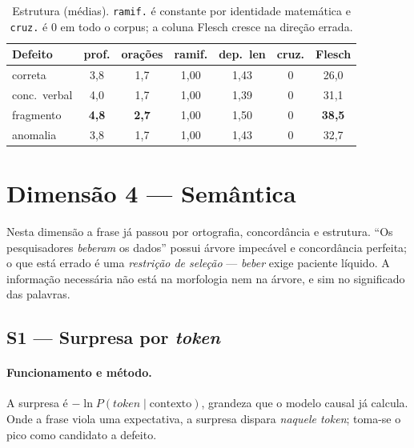 \documentclass[11pt,a4paper]{article}
\newcommand{\dimtable}[1]{\small #1}
\begin{document}
\begin{table}[H]
\centering
\dimtable{
\begin{tabular}{@{}lcccccc@{}}
\toprule
\textbf{Defeito} & \textbf{prof.} & \textbf{orações} & \textbf{ramif.} & \textbf{dep.\ len} & \textbf{cruz.} & \textbf{Flesch} \\
\midrule
correta        & 3{,}8 & 1{,}7 & 1{,}00 & 1{,}43 & 0 & 26{,}0 \\
conc.\ verbal  & 4{,}0 & 1{,}7 & 1{,}00 & 1{,}39 & 0 & 31{,}1 \\
fragmento      & \textbf{4{,}8} & \textbf{2{,}7} & 1{,}00 & 1{,}50 & 0 & \textbf{38{,}5} \\
anomalia       & 3{,}8 & 1{,}7 & 1{,}00 & 1{,}43 & 0 & 32{,}7 \\
\bottomrule
\end{tabular}}
\caption{Estrutura (médias). \texttt{ramif.} é constante por identidade matemática e \texttt{cruz.}
é 0 em todo o corpus; a coluna Flesch cresce na direção errada.}
\label{tab:estrutura}
\end{table}

\section{Dimensão 4 --- Semântica}

Nesta dimensão a frase já passou por ortografia, concordância e estrutura. ``Os pesquisadores
\emph{beberam} os dados'' possui árvore impecável e concordância perfeita; o que está errado é uma
\emph{restrição de seleção} --- \emph{beber} exige paciente líquido. A informação necessária não
está na morfologia nem na árvore, e sim no significado das palavras.

\subsection{S1 --- Surpresa por \textit{token}}

\paragraph{Funcionamento e método.} A surpresa é $-\ln P(\textit{token} \mid \text{contexto})$,
grandeza que o modelo causal já calcula. Onde a frase viola uma expectativa, a surpresa dispara
\emph{naquele token}; toma-se o pico como candidato a defeito.
\end{document}

